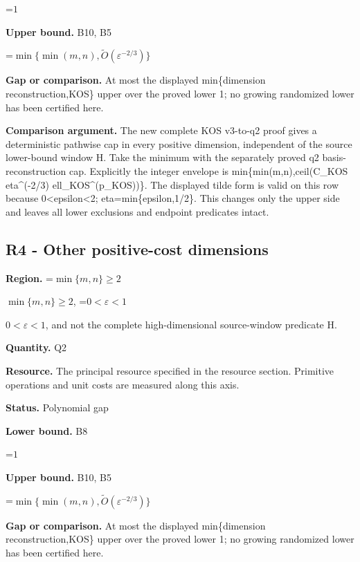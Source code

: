 \documentclass[10pt,a4paper]{article}
\newcommand{\AtlasMath}[1]{\par\begingroup\centering\setbox0=\hbox{$\displaystyle #1$}\ifdim\wd0>1.4\linewidth\typeout{ATLAS WIDE FORMULA: \the\wd0}\fi\ifdim\wd0>\linewidth\resizebox{\linewidth}{!}{\box0}\else\box0\fi\par\endgroup}
\newcommand{\AtlasInlineMath}[1]{\begingroup\setbox0=\hbox{$#1$}\ifdim\wd0>.4\linewidth\endgroup\AtlasMath{#1}\else\endgroup$#1$\fi}
\begin{document}
\AtlasMath{1}


\textbf{Upper bound.} B10, B5



\AtlasMath{\min\{\min(m,n),\widetilde O(\varepsilon^{-2/3})\}}


\textbf{Gap or comparison.} At most the displayed min\{dimension reconstruction,KOS\} upper over the proved lower 1; no growing randomized lower has been certified here.



\textbf{Comparison argument.} The new complete KOS v3-to-q2 proof gives a deterministic pathwise cap in every positive dimension, independent of the source lower-bound window H. Take the minimum with the separately proved q2 basis-reconstruction cap. Explicitly the integer envelope is min\{min(m,n),ceil(C\_KOS eta\textasciicircum{}(-2/3) ell\_KOS\textasciicircum{}(p\_KOS))\}. The displayed tilde form is valid on this row because 0<epsilon<2; eta=min\{epsilon,1/2\}. This changes only the upper side and leaves all lower exclusions and endpoint predicates intact.



\subsection{R4 - Other positive-cost dimensions}


\textbf{Region.} \AtlasInlineMath{\min\{m,n\}\ge2}, \AtlasInlineMath{0<\varepsilon<1}, and not the complete high-dimensional source-window predicate H.



\textbf{Quantity.} Q2



\textbf{Resource.} The principal resource specified in the resource section. Primitive operations and unit costs are measured along this axis.



\textbf{Status.} Polynomial gap



\textbf{Lower bound.} B8



\AtlasMath{1}


\textbf{Upper bound.} B10, B5



\AtlasMath{\min\{\min(m,n),\widetilde O(\varepsilon^{-2/3})\}}


\textbf{Gap or comparison.} At most the displayed min\{dimension reconstruction,KOS\} upper over the proved lower 1; no growing randomized lower has been certified here.
\end{document}
